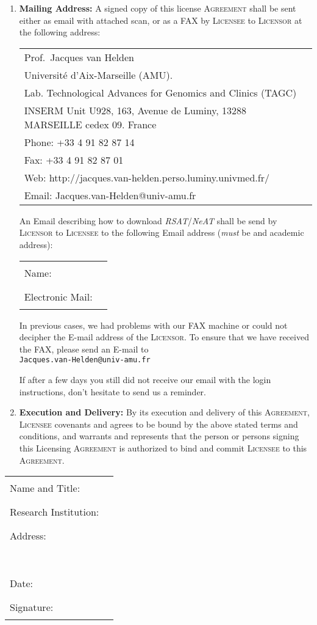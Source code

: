 \documentclass[12pt]{article}
\makeatletter
\newcommand{\RSAT}[0]{\emph{RSAT}\xspace}
\newcommand{\NeAT}[0]{\emph{NeAT}\xspace}
\newcommand{\Licensor}[0]{\textsc{Licensor}\xspace}
\newcommand{\Licensee}[0]{\textsc{Licensee}\xspace}
\newcommand{\Agreement}[0]{\textsc{Agreement}\xspace}
\newcommand{\Fillline}[0]{\rule{10cm}{1pt}}
\newcommand{\Paragraph}[2]{\item \textbf{#1:} #2}
\newcommand{\JvHemail}[0]{\texttt{\small Jacques.van-Helden@univ-amu.fr}\xspace}
\makeatother
\begin{document}
\begin{enumerate}
\Paragraph{Mailing Address}{A signed copy of this license \Agreement
  shall be sent either as email with attached scan, or as a FAX by \Licensee to
  \Licensor at the following address:

  \begin{tabular}{@{}l}
    Prof.\ Jacques van Helden\\
    Université d'Aix-Marseille (AMU). \\
    Lab. Technological Advances for Genomics and Clinics (TAGC) \\
    INSERM Unit U928, 163, Avenue de Luminy, 13288 MARSEILLE cedex 09. France \\
    Phone: +33 4 91 82 87 14 \\
    Fax: +33 4 91 82 87 01 \\
    Web:  http://jacques.van-helden.perso.luminy.univmed.fr/ \\
    Email: Jacques.van-Helden@univ-amu.fr \\
  \end{tabular}

  An Email describing how to download \RSAT/\NeAT shall be send by \Licensor to 
  \Licensee to the following Email address (\emph{must} be and academic address):

\begin{center}
\begin{tabular}{lc}
Name:&\Fillline\\[5mm]
Electronic Mail:&\Fillline
\end{tabular}
\end{center}


In previous cases, we had problems with our FAX machine or could not
decipher the E-mail address of the \Licensor. To ensure that we have 
received the FAX, please send an E-mail to \\

\JvHemail

If after a few days you still did not receive our email with the login
instructions, don't hesitate to send us a reminder.  }

\Paragraph{Execution and Delivery}{By its execution and delivery of 
  this \Agreement, \Licensee covenants and agrees to be bound by the 
  above stated terms and conditions, and warrants and represents that 
  the person or persons signing this Licensing \Agreement is authorized 
  to bind and commit \Licensee to this \Agreement.
}

\end{enumerate}

\begin{center}
\begin{tabular}{lc}
Name and Title:&\Fillline\\[5mm]
Research Institution:&\Fillline\\[5mm]
Address:&\Fillline\\[5mm]
&\Fillline\\[5mm]
Date:&\Fillline \\[5mm]
Signature:&\Fillline
\end{tabular}
\end{center}
\end{document}
